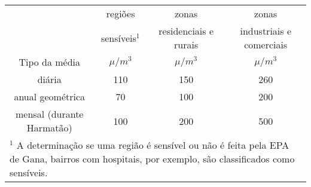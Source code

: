\begin{tabular}{cccc}
\hline
                              &   regiões  &        zonas       &         zonas               \\
                              & sensíveis$^1$  & residenciais e rurais & industriais e comerciais      \\
Tipo da média                 & $\mu / m^3$ & $\mu / m^3$ & $\mu / m^3$      \\
\hline
diária                    & 110             & 150                      & 260         \\       
anual geométrica          & 70              & 100                      & 200                   \\
mensal (durante Harmatão) & 100             & 200                      & 500                     \\
\hline
\multicolumn{4}{l}{$^1$ A determinação se uma região é sensível ou não é feita
                   pela EPA de Gana, bairros com hospitais, por exemplo, são classificados como sensíveis.} \\
\hline
\end{tabular}
